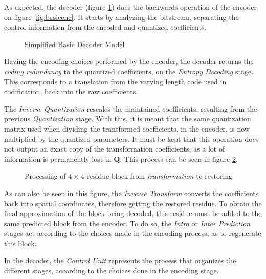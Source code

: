 As expected, the decoder (figure \ref{fig:basicdec}) does the backwards operation of the encoder on figure \ref{fig:basicenc}. It starts by analyzing the bitstream, separating the control information from the encoded and quantized coefficients.

\begin{figure}[!htbp]
    \centering
    
    \caption{Simplified Basic Decoder Model}
    \label{fig:basicdec}
\end{figure}

Having the encoding choices performed by the encoder, the decoder returns the \emph{coding redundancy} to the quantized coefficients, on the \emph{Entropy Decoding} stage. This corresponds to a translation from the varying length code used in codification, back into the raw coefficients.

The \emph{Inverse Quantization} rescales the maintained coefficients, resulting from the previous \emph{Quantization} stage. With this, it is meant that the same quantization matrix used when dividing the transformed coefficients, in the encoder, is now multiplied by the quantized parameters. It must be kept that this operation does not output an exact copy of the transformation coefficients, as a lot of information is permanently lost in \textbf{Q}. This process can be seen in figure \ref{fig:quant}.

\begin{figure}[!htbp]
    \centering
    
    \caption{Processing of $\protect 4\times 4$ residue block from \emph{transformation} to restoring} 
    \label{fig:quant}
\end{figure}

As can also be seen in this figure, the \emph{Inverse Transform} converts the coefficients back into spatial coordinates, therefore getting the restored residue. To obtain the final approximation of the block being decoded, this residue must be added to the same predicted block from the encoder. To do so, the \emph{Intra} or \emph{Inter Prediction} stages act according to the choices made in the encoding process, as to regenerate this block.

In the decoder, the \emph{Control Unit} represents the process that organizes the different stages, according to the choices done in the encoding stage.

\nocite{agostiniDesenvolvimentoArquiteturasAlto2007}

